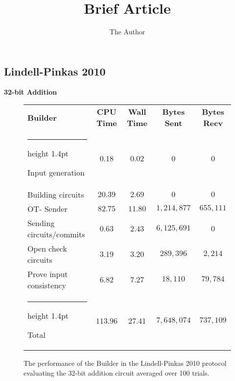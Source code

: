 \documentclass[11pt]{article} %
\title{Brief Article}
\author{The Author}
\makeatletter
\newcommand{\thickhline}{%
    \noalign {\ifnum 0=`}\fi \hrule height 1.4pt
    \futurelet \reserved@a \@xhline
}
\makeatother
\begin{document}
\maketitle



			\subsection{Lindell-Pinkas 2010} \label{sub:LP_2010_Results_Analysis}

				\FloatBarrier
				\noindent \textbf{32-bit Addition}
				\begin{figure}[!ht]
					\begin{tabular}{| p{4.3cm} | c c c c |}
						\hline
						\textbf{Builder} & \textbf{CPU Time} & \textbf{Wall Time} & \textbf{Bytes Sent} & \textbf{Bytes Recv} \\
						\thickhline
						Input generation & $0.18$ & $0.02$ & $0$ & $0$ \\
						\hline
						Building circuits & $20.39$ & $2.69$ & $0$ & $0$ \\
						\hline
						OT- Sender & $82.75$ & $11.80$ & $1,214,877$ & $655,111$ \\
						\hline
						Sending circuits/commits & $0.63$ & $2.43$ & $6,125,691$ & $0$ \\
						\hline
						Open check circuits & $3.19$ & $3.20$ & $289,396$ & $2,214$ \\
						\hline
						Prove input consistency & $6.82$ & $7.27$ & $18,110$ & $79,784$ \\
						\thickhline
						Total & $113.96$ & $27.41$ & $7,648,074$ & $737,109$ \\
						\hline
					\end{tabular}
					\caption{The performance of the Builder in the Lindell-Pinkas 2010 protocol evaluating the 32-bit addition circuit averaged over 100 trials. \label{table:LP_2010_Add_Builder}}
				\end{figure}
					
\end{document}
